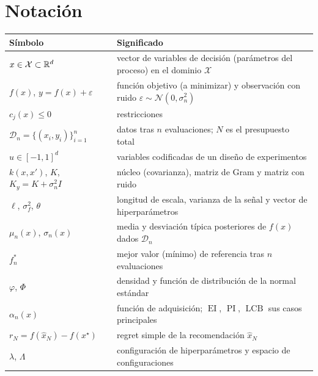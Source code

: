 \documentclass[11pt,a4paper,twoside,openany]{book}
\newcommand{\X}{\mathcal{X}}
\newcommand{\D}{\mathcal{D}}
\newcommand{\N}{\mathcal{N}}
\newcommand{\EI}{\operatorname{EI}}
\newcommand{\PI}{\operatorname{PI}}
\newcommand{\LCB}{\operatorname{LCB}}
\newcommand{\fmejor}{f^{*}_{n}}
\newcommand{\Ky}{K_{y}}
\begin{document}
\section*{Notación}
\begin{center}\small
\begin{tabularx}{\textwidth}{@{}l>{\raggedright\arraybackslash}X@{}}
\toprule
Símbolo & Significado \\
\midrule
$x\in\X\subset\R^{d}$ & vector de variables de decisión (parámetros del proceso) en el dominio $\X$ \\
$f(x)$, $y=f(x)+\varepsilon$ & función objetivo (a minimizar) y observación con ruido $\varepsilon\sim\N(0,\sigma_n^2)$ \\
$c_j(x)\le 0$ & restricciones \\
$\D_n=\{(x_i,y_i)\}_{i=1}^{n}$ & datos tras $n$ evaluaciones; $N$ es el presupuesto total \\
$u\in[-1,1]^{d}$ & variables codificadas de un diseño de experimentos \\
$k(x,x')$, $K$, $\Ky=K+\sigma_n^2 I$ & núcleo (covarianza), matriz de Gram y matriz con ruido \\
$\ell$, $\sigma_f^2$, $\theta$ & longitud de escala, varianza de la señal y vector de hiperparámetros \\
$\mu_n(x)$, $\sigma_n(x)$ & media y desviación típica posteriores de $f(x)$ dados $\D_n$ \\
$\fmejor$ & mejor valor (mínimo) de referencia tras $n$ evaluaciones \\
$\varphi$, $\Phi$ & densidad y función de distribución de la normal estándar \\
$\alpha_n(x)$ & función de adquisición; $\EI$, $\PI$, $\LCB$ sus casos principales \\
$r_N=f(\hat x_N)-f(x^\star)$ & regret simple de la recomendación $\hat x_N$ \\
$\lambda$, $\Lambda$ & configuración de hiperparámetros y espacio de configuraciones \\
\bottomrule
\end{tabularx}
\end{center}

\tableofcontents

\mainmatter







\appendix


\backmatter

\end{document}
